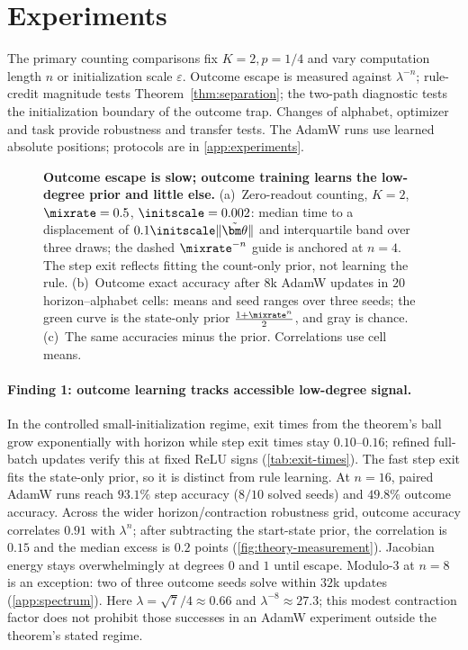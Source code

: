 \section{Experiments}
\label{sec:experiments}
\label{sec:validation}

The primary counting comparisons fix $K=2,p=1/4$ and vary computation length
$n$ or initialization scale $\varepsilon$. Outcome escape is measured against
$\lambda^{-n}$; rule-credit magnitude tests Theorem~\ref{thm:separation};
the two-path diagnostic tests the initialization boundary of the outcome trap.
Changes of alphabet, optimizer and task provide robustness and transfer tests. The AdamW runs use
learned absolute positions; protocols are in \cref{app:experiments}.

\begin{figure}[t]
\centering
\resizebox{\linewidth}{!}{}
\caption{\textbf{Outcome escape is slow; outcome training learns the low-degree prior and little else.}
(a)~Zero-readout counting, $K=2$, $\mixrate=0.5$, $\initscale=0.002$: median time to a displacement of $0.1\initscale\|\tilde{\bm\theta}\|$ and interquartile band over three draws; the dashed $\mixrate^{-n}$ guide is anchored at $n=4$. The step exit reflects fitting the count-only prior, not learning the rule.
(b)~Outcome exact accuracy after $8$k AdamW updates in $20$ horizon--alphabet cells: means and seed ranges over three seeds; the green curve is the state-only prior $\frac{1+\mixrate^n}{2}$, and gray is chance.
(c)~The same accuracies minus the prior. Correlations use cell means.}
\label{fig:theory-measurement}
\label{fig:lambda-grid}
\end{figure}

\paragraph{Finding 1: outcome learning tracks accessible low-degree signal.}
In the controlled small-initialization regime, exit times from the theorem's ball grow
exponentially with horizon while step exit times stay $0.10$--$0.16$; refined full-batch
updates verify this at fixed ReLU signs (\cref{tab:exit-times}). The fast step exit fits
the state-only prior, so it is distinct from rule learning. At $n=16$, paired AdamW runs
reach $93.1\%$ step accuracy ($8/10$ solved seeds) and $49.8\%$ outcome accuracy.
Across the wider horizon/contraction robustness grid, outcome accuracy correlates $0.91$ with $\lambda^n$;
after subtracting the start-state prior, the correlation is $0.15$ and the median excess
is $0.2$ points (\cref{fig:theory-measurement}). Jacobian energy stays overwhelmingly at
degrees $0$ and $1$ until escape. Modulo-$3$ at $n=8$ is an exception: two of three
outcome seeds solve within $32$k updates (\cref{app:spectrum}). Here
$\lambda=\sqrt7/4\approx0.66$ and $\lambda^{-8}\approx27.3$; this modest contraction
factor does not prohibit those successes in an AdamW experiment outside the theorem's stated regime.

